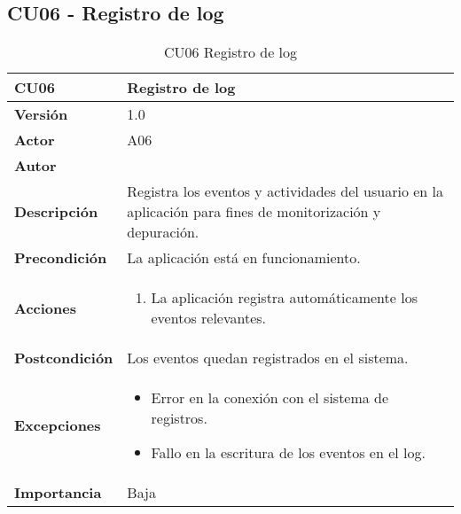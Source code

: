 \subsection{CU06 - Registro de log}
\begin{table}[p]
	\centering
	\begin{tabularx}{\linewidth}{ p{} p{} }
		\toprule
		\textbf{CU06}    & \textbf{Registro de log} \\
		\toprule
		\textbf{Versión}              & 1.0    \\
		\textbf{Actor}                & A06 \\
		\textbf{Autor}                & \autor \\
		\textbf{Descripción}          & Registra los eventos y actividades del usuario en la aplicación para fines de monitorización y depuración. \\
		\textbf{Precondición}         & La aplicación está en funcionamiento. \\
		\textbf{Acciones}             &
		\begin{enumerate}
			\def\labelenumi{\arabic{enumi}.}
			\tightlist
			\item La aplicación registra automáticamente los eventos relevantes.
		\end{enumerate}\\
		\textbf{Postcondición}        & Los eventos quedan registrados en el sistema. \\
		\textbf{Excepciones}          & 
		\begin{itemize}
			\tightlist
			\item Error en la conexión con el sistema de registros.
			\item Fallo en la escritura de los eventos en el log.
		\end{itemize}\\
		\textbf{Importancia}          & Baja \\
		\bottomrule
	\end{tabularx}
	\caption{CU06 Registro de log}
\end{table}


\FloatBarrier


